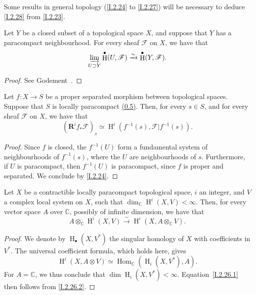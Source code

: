 \documentclass{report}
\theoremstyle{plain}
\newenvironment{corollary}[1]
    {\renewcommand\theinnercustomcorollary{#1}\innercustomcorollary}
    {\endinnercustomcorollary}
\theoremstyle{definition}
\newenvironment{reminder}[1]
    {\renewcommand\theinnercustomreminder{#1}\innercustomreminder}
    {\endinnercustomreminder}
\newcommand{\sh}{\mathscr}
\newcommand{\CC}{\mathbb{C}}
\newcommand{\RR}{\mathbf{R}}
\DeclareMathOperator{\Hom}{Hom}
\DeclareMathOperator{\HH}{H}
\begin{document}
Some results in general topology (\cref{I.2.24} to \cref{I.2.27}) will be necessary to deduce \cref{I.2.28} from \cref{I.2.23}.

\begin{reminder}{2.24}
\label{I.2.24}
  Let $Y$ be a closed subset of a topological space $X$, and suppose that $Y$ has a paracompact neighbourhood.
  For every sheaf $\sh{F}$ on $X$, we have that
  \[
    \varinjlim_{U\supset Y} \HH^\bullet(U,\sh{F}) \xrightarrow{\sim} \HH^\bullet(Y,\sh{F}).
  \]
\end{reminder}

\begin{proof}
  See Godement~\cite[II, 4.11.1, p.~193]{7}.
\end{proof}

\begin{corollary}{2.25}
\label{I.2.25}
  Let $f\colon X\to S$ be a proper separated morphism between topological spaces.
  Suppose that $S$ is locally paracompact \hyperref[0.5]{(0.5)}.
  Then, for every $s\in S$, and for every sheaf $\sh{F}$ on $X$, we have that
  \[
    (\RR^i f_*\sh{F})_s \simeq \HH^i(f^{-1}(s), \sh{F}|f^{-1}(s)).
  \]
\end{corollary}

\begin{proof}
  Since $f$ is closed, the $f^{-1}(U)$ form a fundamental system of neighbourhoods of $f^{-1}(s)$, where the $U$ are neighbourhoods of $s$.
  Furthermore, if $U$ is paracompact, then $f^{-1}(U)$ is paracompact, since $f$ is proper and separated.
  We conclude by \cref{I.2.24}.
\end{proof}

\begin{reminder}{2.26}
\label{I.2.26}
  Let $X$ be a contractible locally paracompact topological space, $i$ an integer, and $V$ a complex local system on $X$, such that $\dim_\CC\HH^i(X,V)<\infty$.
  Then, for every vector space $A$ over $\CC$, possibly of infinite dimension, we have that
  \[
  \label{I.2.26.1}
    A\otimes_\CC\HH^i(X,V) \xrightarrow{\sim} \HH^i(X,A\otimes_\CC V).
  \tag{2.26.1}
  \]
\end{reminder}

\begin{proof}
  We denote by $\HH_\bullet(X,V^*)$ the singular homology of $X$ with coefficients in $V^*$.
  The universal coefficient formula, which holds here, gives
  \[
  \label{I.2.26.2}
    \HH^i(X,A\otimes V) \simeq \Hom_\CC(\HH_i(X,V^*),A).
  \tag{2.26.2}
  \]
  For $A=\CC$, we thus conclude that $\dim\HH_i(X,V^*)<\infty$.
  Equation~\cref{I.2.26.1} then follows from \cref{I.2.26.2}.
\end{proof}
\end{document}
